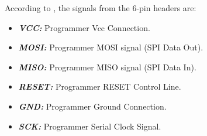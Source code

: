		According to \cite{equinox-isp}, the signals from the 6-pin headers are:

		\begin{itemize}
			\item\textit{\textbf{VCC: }} Programmer Vcc Connection.\label{item:isp-vcc}
			\item\textit{\textbf{MOSI: }} Programmer MOSI signal (SPI Data Out).\label{item:isp-mosi}
			\item\textit{\textbf{MISO: }} Programmer MISO signal (SPI Data In).\label{item:isp-miso}
			\item\textit{\textbf{RESET: }} Programmer RESET Control Line.\label{item:isp-reset}
			\item\textit{\textbf{GND: }} Programmer Ground Connection.\label{item:isp-gnd}
			\item\textit{\textbf{SCK: }} Programmer Serial Clock Signal.\label{item:isp-sck}
		\end{itemize}